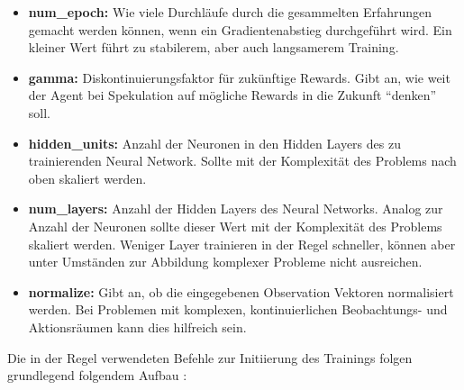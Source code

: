 \begin{itemize}
    \item \textbf{num\_epoch:} Wie viele Durchläufe durch die gesammelten Erfahrungen gemacht werden können, wenn ein Gradientenabstieg durchgeführt wird.
    Ein kleiner Wert führt zu stabilerem, aber auch langsamerem Training.
    \item \textbf{gamma:} Diskontinuierungsfaktor für zukünftige Rewards.
    Gibt an, wie weit der Agent bei Spekulation auf mögliche Rewards in die Zukunft \enquote{denken} soll.
    \item \textbf{hidden\_units:} Anzahl der Neuronen in den Hidden Layers des zu trainierenden Neural Network.
    Sollte mit der Komplexität des Problems nach oben skaliert werden.
    \item \textbf{num\_layers:} Anzahl der Hidden Layers des Neural Networks.
    Analog zur Anzahl der Neuronen sollte dieser Wert mit der Komplexität des Problems skaliert werden.
    Weniger Layer trainieren in der Regel schneller, können aber unter Umständen zur Abbildung komplexer Probleme nicht ausreichen.
    \item \textbf{normalize:} Gibt an, ob die eingegebenen Observation Vektoren normalisiert werden.
    Bei Problemen mit komplexen, kontinuierlichen Beobachtungs- und Aktionsräumen kann dies hilfreich sein.
\end{itemize}

Die in der Regel verwendeten Befehle zur Initiierung des Trainings folgen grundlegend folgendem Aufbau \cite{mlagentsTraining}: \\

